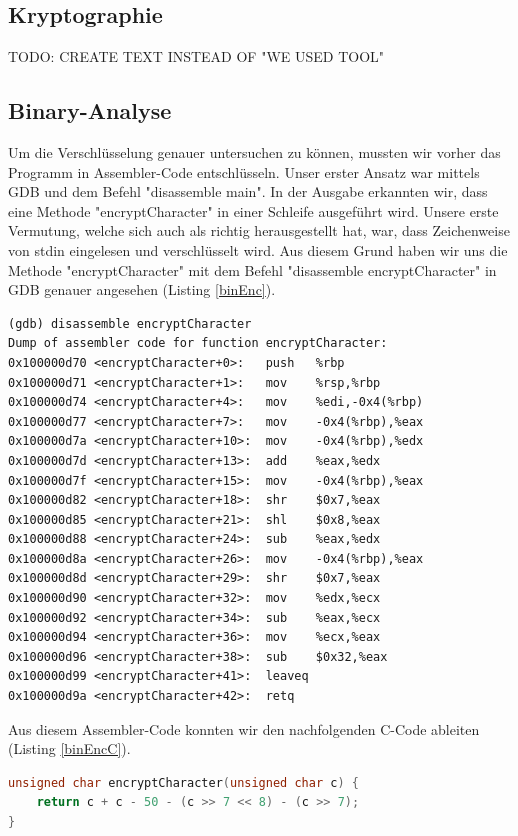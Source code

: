 \documentclass[12pt]{article}
\begin{document}
\subsection{Kryptographie}

TODO: CREATE TEXT INSTEAD OF "WE USED TOOL" 

\subsection{Binary-Analyse}
Um die Verschlüsselung genauer untersuchen zu können, mussten wir vorher das Programm in Assembler-Code entschlüsseln. Unser erster Ansatz war mittels GDB und dem Befehl "disassemble main". In der Ausgabe erkannten wir, dass eine Methode "encryptCharacter" in einer Schleife ausgeführt wird. Unsere erste Vermutung, welche sich auch als richtig herausgestellt hat, war, dass Zeichenweise von stdin eingelesen und verschlüsselt wird. Aus diesem Grund haben wir uns die Methode "encryptCharacter" mit dem Befehl "disassemble encryptCharacter" in GDB genauer angesehen (Listing \ref{binEnc}). 
\begin{lstlisting}[caption={Assembler-Code der Methode encryptCharacter},label=binEnc,basicstyle=\footnotesize]
(gdb) disassemble encryptCharacter
Dump of assembler code for function encryptCharacter:
0x100000d70 <encryptCharacter+0>:	push   %rbp
0x100000d71 <encryptCharacter+1>:	mov    %rsp,%rbp
0x100000d74 <encryptCharacter+4>:	mov    %edi,-0x4(%rbp)
0x100000d77 <encryptCharacter+7>:	mov    -0x4(%rbp),%eax
0x100000d7a <encryptCharacter+10>:	mov    -0x4(%rbp),%edx
0x100000d7d <encryptCharacter+13>:	add    %eax,%edx
0x100000d7f <encryptCharacter+15>:	mov    -0x4(%rbp),%eax
0x100000d82 <encryptCharacter+18>:	shr    $0x7,%eax
0x100000d85 <encryptCharacter+21>:	shl    $0x8,%eax
0x100000d88 <encryptCharacter+24>:	sub    %eax,%edx
0x100000d8a <encryptCharacter+26>:	mov    -0x4(%rbp),%eax
0x100000d8d <encryptCharacter+29>:	shr    $0x7,%eax
0x100000d90 <encryptCharacter+32>:	mov    %edx,%ecx
0x100000d92 <encryptCharacter+34>:	sub    %eax,%ecx
0x100000d94 <encryptCharacter+36>:	mov    %ecx,%eax
0x100000d96 <encryptCharacter+38>:	sub    $0x32,%eax
0x100000d99 <encryptCharacter+41>:	leaveq 
0x100000d9a <encryptCharacter+42>:	retq  
\end{lstlisting}
Aus diesem Assembler-Code konnten wir den nachfolgenden C-Code ableiten (Listing \ref{binEncC}).
\begin{lstlisting}[language=C, caption={C-Code der Methode encryptCharacter},label=binEncC,basicstyle=\footnotesize]
unsigned char encryptCharacter(unsigned char c) {
    return c + c - 50 - (c >> 7 << 8) - (c >> 7);
}
\end{lstlisting}
\end{document}
